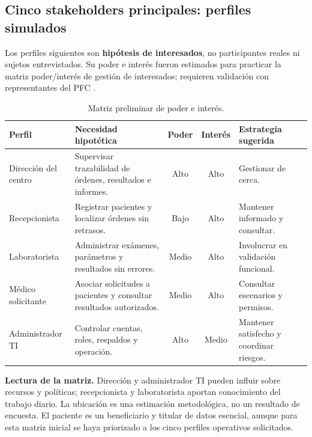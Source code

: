 \subsection{Cinco stakeholders principales: perfiles simulados}
Los perfiles siguientes son \textbf{hipótesis de interesados}, no participantes reales ni sujetos entrevistados. Su poder e interés fueron estimados para practicar la matriz poder/interés de gestión de interesados; requieren validación con representantes del PFC \cite{pmbok2021}.
\begin{table}[H]\centering\scriptsize
\caption{Matriz preliminar de poder e interés.}\label{tab:stakeholders}
\begin{tabularx}{\linewidth}{@{}p{2.0cm}Xccp{2.8cm}@{}}\toprule
\textbf{Perfil} & \textbf{Necesidad hipotética} & \textbf{Poder} & \textbf{Interés} & \textbf{Estrategia sugerida}\\\midrule
Dirección del centro & Supervisar trazabilidad de órdenes, resultados e informes. & Alto & Alto & Gestionar de cerca.\\
Recepcionista & Registrar pacientes y localizar órdenes sin retrasos. & Bajo & Alto & Mantener informado y consultar.\\
Laboratorista & Administrar exámenes, parámetros y resultados sin errores. & Medio & Alto & Involucrar en validación funcional.\\
Médico solicitante & Asociar solicitudes a pacientes y consultar resultados autorizados. & Medio & Alto & Consultar escenarios y permisos.\\
Administrador TI & Controlar cuentas, roles, respaldos y operación. & Alto & Medio & Mantener satisfecho y coordinar riesgos.\\\bottomrule
\end{tabularx}
\end{table}
\textbf{Lectura de la matriz.} Dirección y administrador TI pueden influir sobre recursos y políticas; recepcionista y laboratorista aportan conocimiento del trabajo diario. La ubicación es una estimación metodológica, no un resultado de encuesta. El paciente es un beneficiario y titular de datos esencial, aunque para esta matriz inicial se haya priorizado a los cinco perfiles operativos solicitados.
